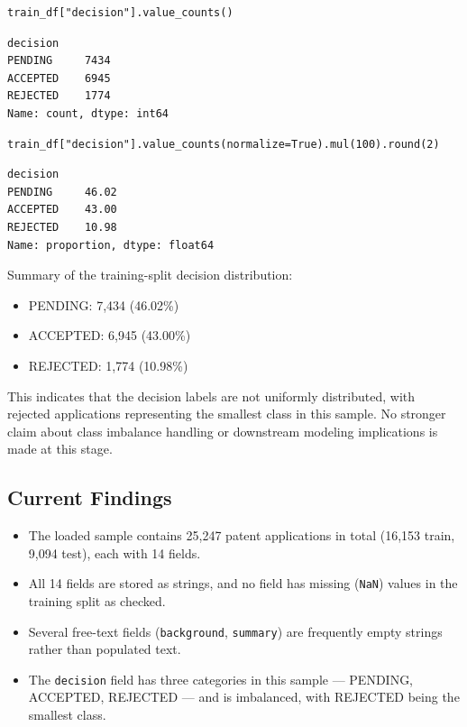 \documentclass[11pt]{article}
\begin{document}
\begin{lstlisting}
train_df["decision"].value_counts()
\end{lstlisting}

\begin{lstlisting}
decision
PENDING     7434
ACCEPTED    6945
REJECTED    1774
Name: count, dtype: int64
\end{lstlisting}

\begin{lstlisting}
train_df["decision"].value_counts(normalize=True).mul(100).round(2)
\end{lstlisting}

\begin{lstlisting}
decision
PENDING     46.02
ACCEPTED    43.00
REJECTED    10.98
Name: proportion, dtype: float64
\end{lstlisting}

\noindent Summary of the training-split decision distribution:

\begin{itemize}
    \item PENDING: 7,434 (46.02\%)
    \item ACCEPTED: 6,945 (43.00\%)
    \item REJECTED: 1,774 (10.98\%)
\end{itemize}

\noindent This indicates that the decision labels are not uniformly distributed, with rejected applications representing the smallest class in this sample. No stronger claim about class imbalance handling or downstream modeling implications is made at this stage.

\subsection{Current Findings}

\begin{itemize}
    \item The loaded sample contains 25,247 patent applications in total (16,153 train, 9,094 test), each with 14 fields.
    \item All 14 fields are stored as strings, and no field has missing (\texttt{NaN}) values in the training split as checked.
    \item Several free-text fields (\texttt{background}, \texttt{summary}) are frequently empty strings rather than populated text.
    \item The \texttt{decision} field has three categories in this sample --- PENDING, ACCEPTED, REJECTED --- and is imbalanced, with REJECTED being the smallest class.
\end{itemize}
\end{document}
